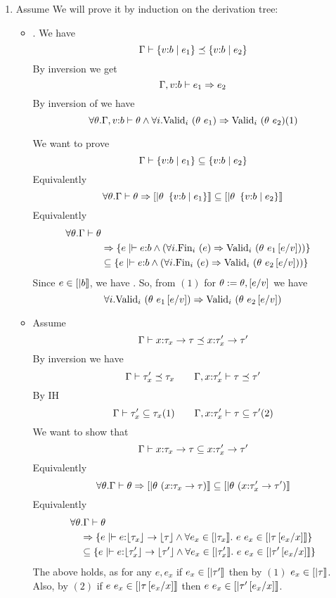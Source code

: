 \begin{enumerate}
\item \label{proof:ssub} Assume  
We will prove it by induction on the derivation tree:
\begin{itemize}
\item\rsubbase. We have
$$\issubtype{\Gamma}{\tref{v}{b}{e_1}}{\tref{v}{b}{e_2}}$$
By inversion we get 
$$\issubref{\Gamma, v\colon b}{e_1}{e_2}$$
By inversion of \rimpl we have
$$	\forall \theta. \iswellformed{\Gamma, v\colon b}{\theta} \land
	\generalconditionImpl{\theta\ e_1}{\theta\ e_2}
(1)$$

We want to prove 
$$\sissubtype{\Gamma}{\tref{v}{b}{e_1}}{\tref{v}{b}{e_2}}$$
Equivalently
$$	
	\forall \theta . \iswellformed{\Gamma}{\theta} \Rightarrow 
	\interp{\theta\ \tref{v}{b}{e_1}} \subseteq \interp{\theta\ \tref{v}{b}{e_2}}
$$
Equivalently
\begin{align*}
	\forall \theta . \iswellformed{\Gamma}{\theta} \\& \Rightarrow 
		\{e \mid \hastype{}{e}{b} 
 			\land 
			\generalconditionInterp{e}{\theta\ e_1\sub{v}{e}} 
		\}	
	\\& \subseteq 
		\{e \mid \hastype{}{e}{b} 
			\land 
			\generalconditionInterp{e}{\theta\ e_2\sub{v}{e}}
		 \}	
\end{align*}
Since $e \in \interp{b}$, we have .
So, from $(1)$ for $\theta := \theta,\sub{v}{e}$
we have 
$$	
	\generalconditionImpl{\theta\ e_1\sub{v}{e}}{\theta\ e_2\sub{v}{e}}
$$

\item\rsubfun Assume
$$
	\issubtype{\Gamma}{\tfunref{x}{\tau_x}{\tau}{v}{e_1}}{\tfunref{x}{\tau'_x}{\tau'}{v}{e_2}}
$$
By inversion we have
$$	
	\issubtype{\Gamma}{\tau'_x}{\tau_x} \qquad
	\issubtype{\Gamma, x \colon \tau'_x}{\tau}{\tau'} 
$$
By IH
$$	
	\sissubtype{\Gamma}{\tau'_x}{\tau_x} (1) \qquad
	\sissubtype{\Gamma, x \colon \tau'_x}{\tau}{\tau'} (2)
$$
We want to show that 
$$
	\sissubtype{\Gamma}
		{\tfunref{x}{\tau_x}{\tau}{v}{e_1}}
		{\tfunref{x}{\tau'_x}{\tau'}{v}{e_2}}
$$
Equivalently
$$	
	\forall \theta . \iswellformed{\Gamma}{\theta} \Rightarrow 
	\interp{\theta\ (\tfunref{x}{\tau_x}{\tau}{v}{e_1})} 
	\subseteq 
	\interp{\theta\ (\tfunref{x}{\tau'_x}{\tau'}{v}{e_2})}
$$
Equivalently
\begin{align*}
	\forall \theta &. \iswellformed{\Gamma}{\theta} \\&\Rightarrow 
	\{e \mid \hastype{}{e}{\erase{\tau_x} \rightarrow \erase{\tau}} 
	\land 
	\forall e_x \in \interp{\tau_x}. \
	 \eapp{e}{e_x} \in \interp{\tau\sub{x}{e_x}} 
	 \}\\ &
	\subseteq 
	\{e \mid \hastype{}{e}{\erase{\tau'_x} \rightarrow \erase{\tau'}} 
	\land 
	\forall e_x \in \interp{\tau'_x}. \
	 \eapp{e}{e_x} \in \interp{\tau'\sub{x}{e_x}} 
	 \}
\end{align*}
The above holds, as for any $e, e_x$
if $e_x \in \interp{\tau'}$
then by $(1)$
$e_x \in \interp{\tau}$.
Also, by $(2)$
if $\eapp{e}{e_x} \in \interp{\tau\sub{x}{e_x}}$
then
$\eapp{e}{e_x} \in \interp{\tau'\sub{x}{e_x}}$.
\end{itemize}
 

\end{enumerate}
